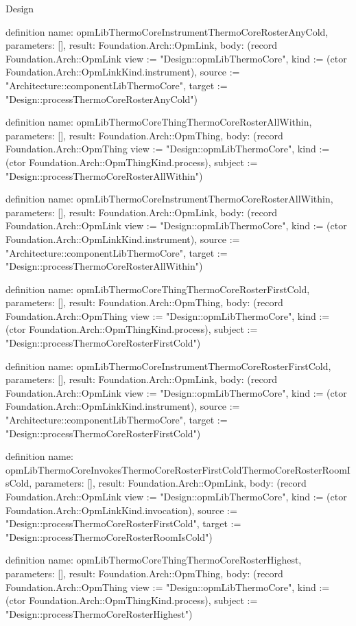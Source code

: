 \begin{lexlean}{Design}
\begin{semanticmodule}
definition{
  name: opmLibThermoCoreInstrumentThermoCoreRosterAnyCold,
  parameters: [],
  result: Foundation.Arch::OpmLink,
  body: (record Foundation.Arch::OpmLink {view := "Design::opmLibThermoCore", kind := (ctor Foundation.Arch::OpmLinkKind.instrument), source := "Architecture::componentLibThermoCore", target := "Design::processThermoCoreRosterAnyCold"})
}

definition{
  name: opmLibThermoCoreThingThermoCoreRosterAllWithin,
  parameters: [],
  result: Foundation.Arch::OpmThing,
  body: (record Foundation.Arch::OpmThing {view := "Design::opmLibThermoCore", kind := (ctor Foundation.Arch::OpmThingKind.process), subject := "Design::processThermoCoreRosterAllWithin"})
}

definition{
  name: opmLibThermoCoreInstrumentThermoCoreRosterAllWithin,
  parameters: [],
  result: Foundation.Arch::OpmLink,
  body: (record Foundation.Arch::OpmLink {view := "Design::opmLibThermoCore", kind := (ctor Foundation.Arch::OpmLinkKind.instrument), source := "Architecture::componentLibThermoCore", target := "Design::processThermoCoreRosterAllWithin"})
}

definition{
  name: opmLibThermoCoreThingThermoCoreRosterFirstCold,
  parameters: [],
  result: Foundation.Arch::OpmThing,
  body: (record Foundation.Arch::OpmThing {view := "Design::opmLibThermoCore", kind := (ctor Foundation.Arch::OpmThingKind.process), subject := "Design::processThermoCoreRosterFirstCold"})
}

definition{
  name: opmLibThermoCoreInstrumentThermoCoreRosterFirstCold,
  parameters: [],
  result: Foundation.Arch::OpmLink,
  body: (record Foundation.Arch::OpmLink {view := "Design::opmLibThermoCore", kind := (ctor Foundation.Arch::OpmLinkKind.instrument), source := "Architecture::componentLibThermoCore", target := "Design::processThermoCoreRosterFirstCold"})
}

definition{
  name: opmLibThermoCoreInvokesThermoCoreRosterFirstColdThermoCoreRosterRoomIsCold,
  parameters: [],
  result: Foundation.Arch::OpmLink,
  body: (record Foundation.Arch::OpmLink {view := "Design::opmLibThermoCore", kind := (ctor Foundation.Arch::OpmLinkKind.invocation), source := "Design::processThermoCoreRosterFirstCold", target := "Design::processThermoCoreRosterRoomIsCold"})
}

definition{
  name: opmLibThermoCoreThingThermoCoreRosterHighest,
  parameters: [],
  result: Foundation.Arch::OpmThing,
  body: (record Foundation.Arch::OpmThing {view := "Design::opmLibThermoCore", kind := (ctor Foundation.Arch::OpmThingKind.process), subject := "Design::processThermoCoreRosterHighest"})
}


\end{semanticmodule}
\end{lexlean}
